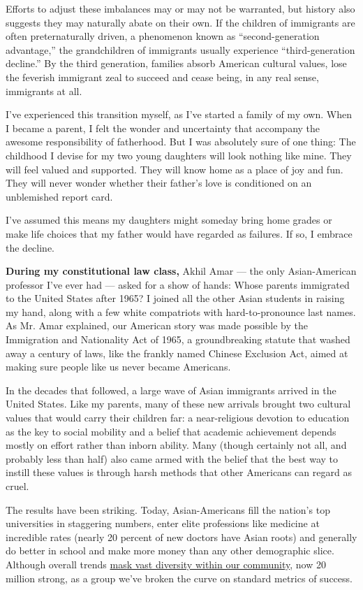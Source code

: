 Efforts to adjust these imbalances may or may not be warranted, but
history also suggests they may naturally abate on their own. If the
children of immigrants are often preternaturally driven, a phenomenon
known as ``second-generation advantage,'' the grandchildren of
immigrants usually experience ``third-generation decline.'' By the third
generation, families absorb American cultural values, lose the feverish
immigrant zeal to succeed and cease being, in any real sense, immigrants
at all.

I've experienced this transition myself, as I've started a family of my
own. When I became a parent, I felt the wonder and uncertainty that
accompany the awesome responsibility of fatherhood. But I was absolutely
sure of one thing: The childhood I devise for my two young daughters
will look nothing like mine. They will feel valued and supported. They
will know home as a place of joy and fun. They will never wonder whether
their father's love is conditioned on an unblemished report card.

I've assumed this means my daughters might someday bring home grades or
make life choices that my father would have regarded as failures. If so,
I embrace the decline.

\textbf{During my constitutional law class,} Akhil Amar --- the only
Asian-American professor I've ever had --- asked for a show of hands:
Whose parents immigrated to the United States after 1965? I joined all
the other Asian students in raising my hand, along with a few white
compatriots with hard-to-pronounce last names. As Mr. Amar explained,
our American story was made possible by the Immigration and Nationality
Act of 1965, a groundbreaking statute that washed away a century of
laws, like the frankly named Chinese Exclusion Act, aimed at making sure
people like us never became Americans.

In the decades that followed, a large wave of Asian immigrants arrived
in the United States. Like my parents, many of these new arrivals
brought two cultural values that would carry their children far: a
near-religious devotion to education as the key to social mobility and a
belief that academic achievement depends mostly on effort rather than
inborn ability. Many (though certainly not all, and probably less than
half) also came armed with the belief that the best way to instill these
values is through harsh methods that other Americans can regard as
cruel.

The results have been striking. Today, Asian-Americans fill the nation's
top universities in staggering numbers, enter elite professions like
medicine at incredible rates (nearly 20 percent of new doctors have
Asian roots) and generally do better in school and make more money than
any other demographic slice. Although overall trends
\href{https://www.americanprogress.org/issues/race/reports/2016/12/20/295359/wealth-inequality-among-asian-americans-greater-than-among-whites/}{mask
vast diversity within our community}, now 20 million strong, as a group
we've broken the curve on standard metrics of success.

